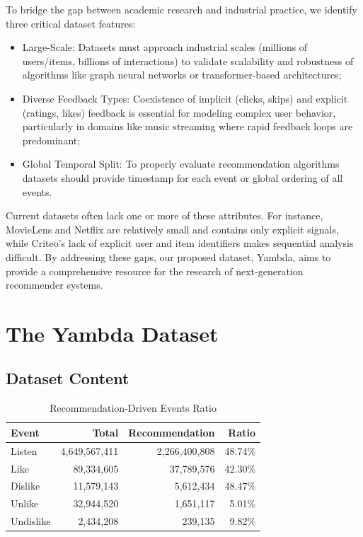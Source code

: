 \documentclass[sigconf,authorversion,nonacm]{acmart}
\begin{document}
To bridge the gap between academic research and industrial practice, we identify three critical dataset features:
\begin{itemize}
    \item Large-Scale: Datasets must approach industrial scales (millions of users/items, billions of interactions) to validate scalability and robustness of algorithms like graph neural networks or transformer-based architectures;
    \item Diverse Feedback Types: Coexistence of implicit (clicks, skips) and explicit (ratings, likes) feedback is essential for modeling complex user behavior, particularly in domains like music streaming where rapid feedback loops are predominant;
    \item Global Temporal Split: To properly evaluate recommendation algorithms datasets should provide timestamp for each event or global ordering of all events.
\end{itemize}

Current datasets often lack one or more of these attributes. For instance, MovieLens and Netflix are relatively small and contains only explicit signals, while Criteo’s lack of explicit user and item identifiers makes sequential analysis difficult. By addressing these gaps, our proposed dataset, Yambda, aims to provide a comprehensive resource for the research of next-generation recommender systems.

\section{The Yambda Dataset}\label{sec:yambda}

\subsection{Dataset Content}

\begin{table}
  \caption{Recommendation-Driven Events Ratio}
  \label{tab:is_organic_distr}
  \begin{tabular}{lrrr}
    \toprule
    Event & Total & Recommendation & Ratio \\
    \midrule
    Listen & 4,649,567,411 & 2,266,400,808 & 48.74\% \\
    Like & 89,334,605 & 37,789,576 & 42.30\% \\
    Dislike & 11,579,143 & 5,612,434 & 48.47\% \\
    Unlike & 32,944,520 & 1,651,117 & 5.01\% \\
    Undislike & 2,434,208 & 239,135 & 9.82\% \\
    \bottomrule
  \end{tabular}
\end{table}
\end{document}
